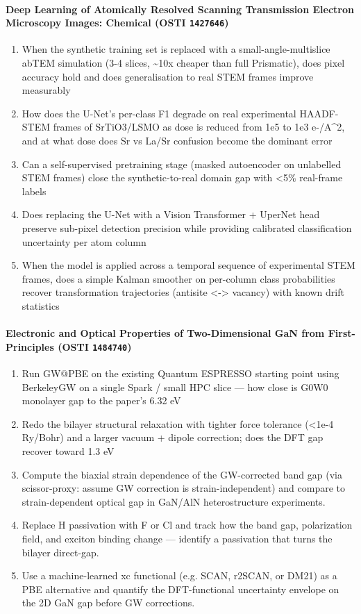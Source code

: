 \documentclass[11pt]{article}
\begin{document}
\paragraph{Deep Learning of Atomically Resolved Scanning Transmission Electron Microscopy Images: Chemical \textnormal{\small(OSTI \texttt{1427646})}}
\begin{enumerate}[leftmargin=1.6em,itemsep=0.2em,topsep=0.2em,label=Q\arabic*.]
\item When the synthetic training set is replaced with a small-angle-multislice abTEM simulation (3-4 slices, \textasciitilde{}10x cheaper than full Prismatic), does pixel accuracy hold and does generalisation to real STEM frames improve measurably
\item How does the U-Net's per-class F1 degrade on real experimental HAADF-STEM frames of SrTiO3/LSMO as dose is reduced from 1e5 to 1e3 e-/A\textasciicircum{}2, and at what dose does Sr vs La/Sr confusion become the dominant error
\item Can a self-supervised pretraining stage (masked autoencoder on unlabelled STEM frames) close the synthetic-to-real domain gap with \textless{}5\% real-frame labels
\item Does replacing the U-Net with a Vision Transformer + UperNet head preserve sub-pixel detection precision while providing calibrated classification uncertainty per atom column
\item When the model is applied across a temporal sequence of experimental STEM frames, does a simple Kalman smoother on per-column class probabilities recover transformation trajectories (antisite \textless{}-\textgreater{} vacancy) with known drift statistics
\end{enumerate}
\paragraph{Electronic and Optical Properties of Two-Dimensional GaN from First-Principles \textnormal{\small(OSTI \texttt{1484740})}}
\begin{enumerate}[leftmargin=1.6em,itemsep=0.2em,topsep=0.2em,label=Q\arabic*.]
\item Run GW@PBE on the existing Quantum ESPRESSO starting point using BerkeleyGW on a single Spark / small HPC slice --- how close is G0W0 monolayer gap to the paper's 6.32 eV
\item Redo the bilayer structural relaxation with tighter force tolerance (\textless{}1e-4 Ry/Bohr) and a larger vacuum + dipole correction; does the DFT gap recover toward 1.3 eV
\item Compute the biaxial strain dependence of the GW-corrected band gap (via scissor-proxy: assume GW correction is strain-independent) and compare to strain-dependent optical gap in GaN/AlN heterostructure experiments.
\item Replace H passivation with F or Cl and track how the band gap, polarization field, and exciton binding change --- identify a passivation that turns the bilayer direct-gap.
\item Use a machine-learned xc functional (e.g. SCAN, r2SCAN, or DM21) as a PBE alternative and quantify the DFT-functional uncertainty envelope on the 2D GaN gap before GW corrections.
\end{enumerate}
\end{document}
